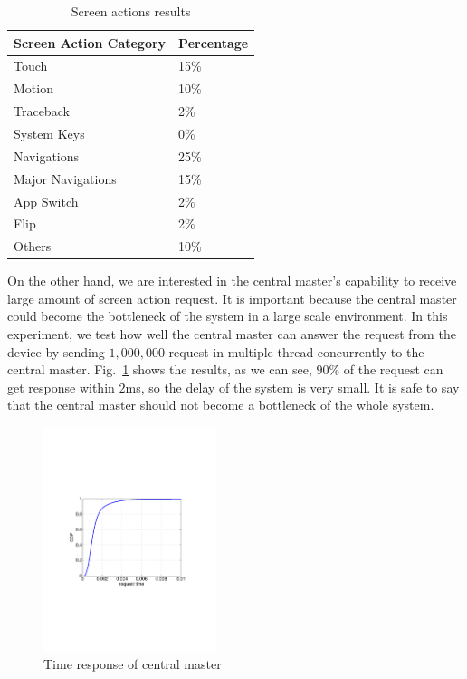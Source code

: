\begin{table}
\centering
\caption{Screen actions results}
\begin{tabular}{ll} \toprule
Screen Action Category & Percentage \\\midrule
Touch & 15\% \\
Motion & 10\% \\
Traceback & 2\% \\
System Keys & 0\% \\
Navigations & 25\% \\
Major Navigations & 15\% \\
App Switch & 2\%\\
Flip & 2\% \\
Others & 10\% \\\bottomrule
\end{tabular}
\label{tab:screen}
\end{table}

On the other hand, we are interested in the central master's capability to receive large amount of screen action request. It is important because the central master could become the bottleneck of the system in a large scale environment. In this experiment, we test how well the central master can answer the request from the device by sending $1,000,000$ request in multiple thread concurrently to the central master. Fig.~\ref{fig:time} shows the results, as we can see, $90\%$ of the request can get response within $2$ms, so the delay of the system is very small. It is safe to say that the central master should not become a bottleneck of the whole system.

\begin{figure}
\includegraphics[width=0.45\textwidth]{figures/time.pdf}
\caption{Time response of central master}
\label{fig:time}
\end{figure}
